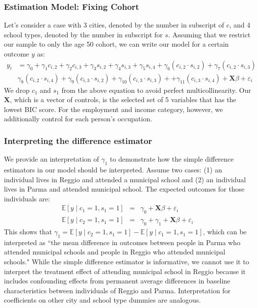\documentclass[11pt]{article}
\begin{document}
\subsubsection{Estimation Model: Fixing Cohort}

Let's consider a case with 3 cities, denoted by the number in subscript of $c$, and 4 school types, denoted by the number in subscript for $s$. Assuming that we restrict our sample to only the age 50 cohort, we can write our model for a certain outcome $y$ as:
\begin{eqnarray}  \label{eq:specific2}
y_i & = \gamma_0 + \gamma_1 c_{i,2} + \gamma_2 c_{i,3} + \gamma_3 s_{i,2} + \gamma_4 s_{i,3} + \gamma_5 s_{i,4}  + \gamma_6 ({c_{i,2}}\cdot{s_{i,2}}) + \gamma_7 ({c_{i,2}}\cdot{s_{i,3}})  \nonumber \\
 & \gamma_8 ({c_{i,2}}\cdot{s_{i,4}}) + \gamma_9 ({c_{i,3}}\cdot{s_{i,2}}) + \gamma_{10} ({c_{i,3}}\cdot{s_{i,3}}) +  + \gamma_{11} ({c_{i,3}}\cdot{s_{i,4}}) + \mathbf{X}\beta + \varepsilon_i  
\end{eqnarray}
We drop $c_1$ and $s_1$ from the above equation to avoid perfect multicollinearity. Our $\mathbf{X}$, which is a vector of controls, is the selected set of 5 variables that has the lowest BIC score. For the employment and income category, however, we additionally control for each person's occupation.

\subsubsection{Interpreting the difference estimator}

We provide an interpretation of $\gamma_1$ to demonstrate how the simple difference estimators in our model should be interpreted. Assume two cases: (1) an individual lives in Reggio and attended a municipal school and (2) an individual lives in Parma and attended municipal school. The expected outcomes for those individuals are:
\begin{eqnarray*}  
    \mathbb{E}[y \mid c_1 = 1, s_1 = 1] & = & \gamma_0 + \mathbf{X}\beta + \varepsilon_i \\
    \mathbb{E}[y \mid c_2 = 1, s_1 = 1] & = & \gamma_0 + \gamma_1 + \mathbf{X}\beta + \varepsilon_i      
\end{eqnarray*}
This shows that $\gamma_1 = \mathbb{E}[y \mid c_2 = 1, s_1 = 1] - \mathbb{E}[y \mid c_1 = 1, s_1 = 1]$, which can be interpreted as ``the mean difference in outcomes between people in Parma who attended municipal schools and people in Reggio who attended municipal schools." While the simple difference estimator is informative, we cannot use it to interpret the treatment effect of attending municipal school in Reggio because it includes confounding effects from permanent average differences in baseline characteristics between individuals of Reggio and Parma. Interpretation for coefficients on other city and school type dummies are analogous.
\end{document}
